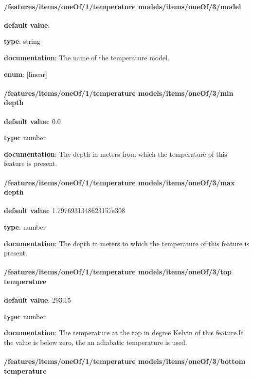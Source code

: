 \paragraph{/features/items/oneOf/1/temperature models/items/oneOf/3/model} \begin{itemized}
\item {\bf default value}: 
\item {\bf type}: string
\item {\bf documentation}: The name of the temperature model.
\item {\bf enum}: [linear]\end{itemized}\paragraph{/features/items/oneOf/1/temperature models/items/oneOf/3/min depth} \begin{itemized}
\item {\bf default value}: 0.0
\item {\bf type}: number
\item {\bf documentation}: The depth in meters from which the temperature of this feature is present.
\end{itemized}\paragraph{/features/items/oneOf/1/temperature models/items/oneOf/3/max depth} \begin{itemized}
\item {\bf default value}: 1.7976931348623157e308
\item {\bf type}: number
\item {\bf documentation}: The depth in meters to which the temperature of this feature is present.
\end{itemized}\paragraph{/features/items/oneOf/1/temperature models/items/oneOf/3/top temperature} \begin{itemized}
\item {\bf default value}: 293.15
\item {\bf type}: number
\item {\bf documentation}: The temperature at the top in degree Kelvin of this feature.If the value is below zero, the an adiabatic temperature is used.
\end{itemized}\paragraph{/features/items/oneOf/1/temperature models/items/oneOf/3/bottom temperature} \begin{itemized}

\end{itemized}
